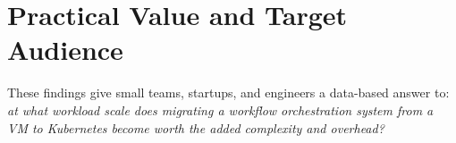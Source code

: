 
\section{Practical Value and Target Audience}
\label{sec:practical-value}

These findings give small teams, startups, and engineers a data-based answer to: \emph{at what workload scale does migrating a workflow orchestration system from a VM to Kubernetes become worth the added complexity and overhead?}
